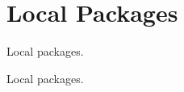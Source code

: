 \hypertarget{group__LocalPackages}{}\section{Local Packages}
\label{group__LocalPackages}


Local packages.  


Local packages. 

